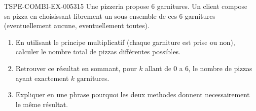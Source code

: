 \begin{exercice}{TSPE-COMBI-EX-005}{3}{15}
Une pizzeria propose $6$ garnitures. Un client compose sa pizza en choisissant librement un sous-ensemble de ces $6$ garnitures (eventuellement aucune, eventuellement toutes).
\begin{enumerate}
  \item En utilisant le principe multiplicatif (chaque garniture est prise ou non), calculer le nombre total de pizzas différentes possibles.
  \item Retrouver ce résultat en sommant, pour $k$ allant de $0$ a $6$, le nombre de pizzas ayant exactement $k$ garnitures.
  \item Expliquer en une phrase pourquoi les deux methodes donnent necessairement le même résultat.
\end{enumerate}
\end{exercice}
